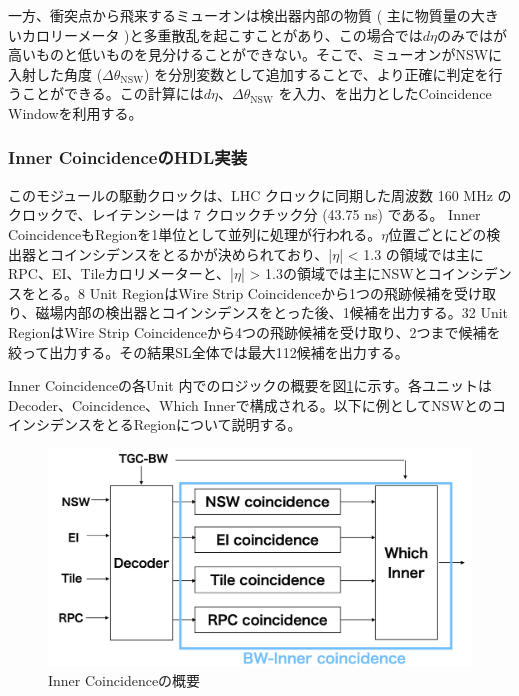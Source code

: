 一方、衝突点から飛来するミューオンは検出器内部の物質 ( 主に物質量の大きいカロリーメータ )と多重散乱を起こすことがあり、この場合では$d\eta$のみでは\pt が高いものと低いものを見分けることができない。そこで、ミューオンがNSWに入射した角度 ($\Delta\theta_{\mathrm{NSW}}$) を分別変数として追加することで、より正確に\pt 判定を行うことができる。この計算には$d\eta$、$\Delta\theta_{\mathrm{NSW}}$ を入力、\pt を出力としたCoincidence Windowを利用する。

\subsubsection*{Inner CoincidenceのHDL実装}
このモジュールの駆動クロックは、LHC クロックに同期した周波数 160 MHz のクロックで、レイテンシーは 7 クロックチック分 (43.75 ns) である。
Inner CoincidenceもRegionを1単位として並列に処理が行われる。$\eta$位置ごとにどの検出器とコインシデンスをとるかが決められており、|$\eta$| < 1.3 の領域では主にRPC、EI、Tileカロリメーターと、|$\eta$| > 1.3の領域では主にNSWとコインシデンスをとる。8 Unit RegionはWire Strip Coincidenceから1つの飛跡候補を受け取り、磁場内部の検出器とコインシデンスをとった後、1候補を出力する。32 Unit RegionはWire Strip Coincidenceから4つの飛跡候補を受け取り、2つまで候補を絞って出力する。その結果SL全体では最大112候補を出力する。

Inner Coincidenceの各Unit 内でのロジックの概要を図\ref{Inner_logic}に示す。各ユニットはDecoder、Coincidence、Which Innerで構成される。以下に例としてNSWとのコインシデンスをとるRegionについて説明する。

\begin{figure} 
\centering
\includegraphics[width=16cm]{fig/SL/Inner_integrate.png}
\caption[Inner Coincidenceの概要]{Inner Coincidenceの概要\cite{mt_kobayashi}}
\label{Inner_logic}
\end{figure}

